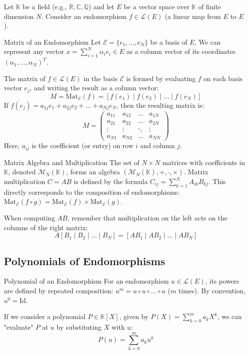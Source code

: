 \documentclass[11pt, a4paper]{article}
\newcommand{\R}{\mathbb{R}}
\newcommand{\Q}{\mathbb{Q}}
\newcommand{\C}{\mathbb{C}}
\begin{document}
Let $\mathbb{K}$ be a field (e.g., $\R, \C, \Q$) and let $E$ be a vector space over $\mathbb{K}$ of finite dimension $N$. 
Consider an endomorphism $f \in \mathcal{L}(E)$ (a linear map from $E$ to $E$). 

\begin{definition}{Matrix of an Endomorphism}{}
Let $\mathcal{E} = \{e_1, \dots, e_N\}$ be a basis of $E$. 
We can represent any vector $x = \sum_{i=1}^N \alpha_i e_i \in E$ as a column vector of its coordinates $(\alpha_1, \dots, \alpha_N)^T$. 

The matrix of $f \in \mathcal{L}(E)$ in the basis $\mathcal{E}$ is formed by evaluating $f$ on each basis vector $e_j$, and writing the result as a column vector:
$$ M = \text{Mat}_{\mathcal{E}}(f) = \left[ f(e_1) \mid f(e_2) \mid \dots \mid f(e_N) \right] $$ 
If $f(e_j) = a_{1j}e_1 + a_{2j}e_2 + \dots + a_{Nj}e_N$, then the resulting matrix is:
$$ M = \begin{pmatrix} 
a_{11} & a_{12} & \dots & a_{1N} \\ 
a_{21} & a_{22} & \dots & a_{2N} \\ 
\vdots & \vdots & \ddots & \vdots \\ 
a_{N1} & a_{N2} & \dots & a_{NN} 
\end{pmatrix} $$ 
Here, $a_{ij}$ is the coefficient (or entry) on row $i$ and column $j$. 
\end{definition}

\begin{remark}{Matrix Algebra and Multiplication}{}
The set of $N \times N$ matrices with coefficients in $\mathbb{K}$, denoted $\mathcal{M}_N(\mathbb{K})$, forms an algebra $(\mathcal{M}_N(\mathbb{K}), +, \cdot, \times)$. 
Matrix multiplication $C = AB$ is defined by the formula $C_{ij} = \sum_{k=1}^N A_{ik} B_{kj}$. 
This directly corresponds to the composition of endomorphisms: $\text{Mat}_{\mathcal{E}}(f \circ g) = \text{Mat}_{\mathcal{E}}(f) \times \text{Mat}_{\mathcal{E}}(g)$. 

When computing $AB$, remember that multiplication on the left acts on the columns of the right matrix:
$$ A [B_1 \mid B_2 \mid \dots \mid B_N] = [AB_1 \mid AB_2 \mid \dots \mid AB_N] $$ 
\end{remark}

\subsection{Polynomials of Endomorphisms}

\begin{definition}{Polynomial of an Endomorphism}{}
For an endomorphism $u \in \mathcal{L}(E)$, its powers are defined by repeated composition: $u^m = u \circ u \circ \dots \circ u$ ($m$ times). By convention, $u^0 = \text{Id}$. 

If we consider a polynomial $P \in \mathbb{K}[X]$, given by $P(X) = \sum_{k=0}^m a_k X^k$, we can "evaluate" $P$ at $u$ by substituting $X$ with $u$:
$$ P(u) = \sum_{k=0}^m a_k u^k $$ 
\end{definition}
\end{document}
